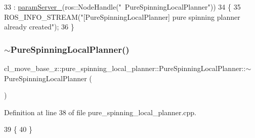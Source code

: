 \begin{DoxyCode}
33   : \hyperlink{classcl__move__base__z_1_1pure__spinning__local__planner_1_1PureSpinningLocalPlanner_a5e91943cf4500d35199004a09cc09ca4}{paramServer\_}(ros::NodeHandle(\textcolor{stringliteral}{"~PureSpinningLocalPlanner"}))
34 \{
35   ROS\_INFO\_STREAM(\textcolor{stringliteral}{"[PureSpinningLocalPlanner] pure spinning planner already created"});
36 \}
\end{DoxyCode}
\mbox{\label{classcl__move__base__z_1_1pure__spinning__local__planner_1_1PureSpinningLocalPlanner_a7b4b13645d8d0d93f341e8eafe64d855}} 
\subsubsection{\texorpdfstring{$\sim$\+Pure\+Spinning\+Local\+Planner()}{~PureSpinningLocalPlanner()}}
{\footnotesize\ttfamily cl\+\_\+move\+\_\+base\+\_\+z\+::pure\+\_\+spinning\+\_\+local\+\_\+planner\+::\+Pure\+Spinning\+Local\+Planner\+::$\sim$\+Pure\+Spinning\+Local\+Planner (\begin{DoxyParamCaption}{ }\end{DoxyParamCaption})\hspace{0.3cm}{\ttfamily [virtual]}}



Definition at line 38 of file pure\+\_\+spinning\+\_\+local\+\_\+planner.\+cpp.


\begin{DoxyCode}
39 \{
40 \}
\end{DoxyCode}


